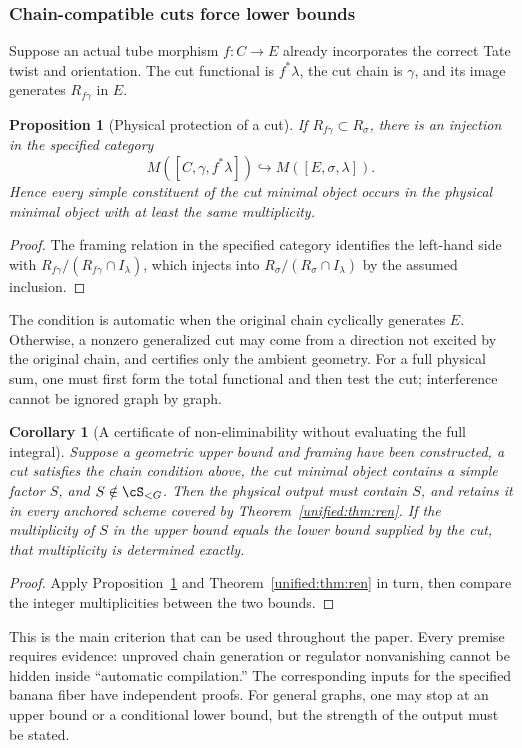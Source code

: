 \documentclass[11pt,a4paper,oneside]{article}
\theoremstyle{plain}
\newtheorem{proposition}[theorem]{Proposition}
\newtheorem{corollary}[theorem]{Corollary}
\theoremstyle{definition}
\theoremstyle{remark}
\numberwithin{equation}{section}
\begin{document}
\subsubsection{Chain-compatible cuts force lower bounds}
Suppose an actual tube morphism $f:C\to E$ already incorporates the correct Tate twist and orientation.
The cut functional is $f^*\lambda$, the cut chain is $\gamma$,
and its image generates $R_{f\gamma}$ in $E$.
\begin{proposition}[Physical protection of a cut]\label{unified:prop:lower}
If $R_{f\gamma}\subset R_\sigma$, there is an injection in the specified category
\[
 M([C,\gamma,f^*\lambda])\hookrightarrow M([E,\sigma,\lambda]).
\]
Hence every simple constituent of the cut minimal object occurs in the physical minimal object with at least the same multiplicity.
\end{proposition}
\begin{proof}
The framing relation in the specified category identifies the left-hand side with
$R_{f\gamma}/(R_{f\gamma}\cap I_\lambda)$,
which injects into $R_\sigma/(R_\sigma\cap I_\lambda)$ by the assumed inclusion.
\end{proof}
The condition is automatic when the original chain cyclically generates $E$.
Otherwise, a nonzero generalized cut may come from a direction not excited by the original chain, and certifies only the ambient geometry.
For a full physical sum, one must first form the total functional and then test the cut; interference cannot be ignored graph by graph.

\begin{corollary}[A certificate of non-eliminability without evaluating the full integral]\label{unified:cor:prediction}
Suppose a geometric upper bound and framing have been constructed, a cut satisfies the chain condition above,
the cut minimal object contains a simple factor $S$, and $S\notin\cS_{<G}$.
Then the physical output must contain $S$, and retains it in every anchored scheme covered by Theorem~\ref{unified:thm:ren}.
If the multiplicity of $S$ in the upper bound equals the lower bound supplied by the cut, that multiplicity is determined exactly.
\end{corollary}
\begin{proof}
Apply Proposition~\ref{unified:prop:lower} and Theorem~\ref{unified:thm:ren} in turn, then compare the integer multiplicities between the two bounds.
\end{proof}
This is the main criterion that can be used throughout the paper. Every premise requires evidence:
unproved chain generation or regulator nonvanishing cannot be hidden inside ``automatic compilation.''
The corresponding inputs for the specified banana fiber have independent proofs.
For general graphs, one may stop at an upper bound or a conditional lower bound, but the strength of the output must be stated.
\end{document}
